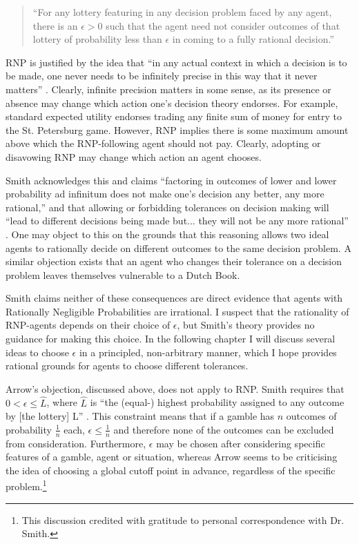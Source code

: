 \documentclass{article}
\begin{document}
\begin{quote}
\onehalfspacing
``For any lottery featuring in any decision problem faced by any agent, there is an \(\epsilon > 0\) such that the agent need not consider outcomes of that lottery of probability less than \(\epsilon\) in coming to a fully rational decision.'' \citep[pg. 472]{smith2014evaluative}
\end{quote}

\noindent
RNP is justified by the idea that ``in any actual context in which a decision is to be made, one never needs to be infinitely precise in this way \textemdash{} that it never matters'' \citep[pg. 474]{smith2014evaluative}. Clearly, infinite precision matters in some sense, as its presence or absence may change which action one's decision theory endorses. For example, standard expected utility endorses trading any finite sum of money for entry to the St. Petersburg game. However, RNP implies there is some maximum amount above which the RNP-following agent should not pay. Clearly, adopting or disavowing RNP may change which action an agent chooses.

Smith acknowledges this and claims ``factoring in outcomes of lower and lower probability ad infinitum does not make one’s decision any better, any more rational,'' and that allowing or forbidding tolerances on decision making will ``lead to different decisions being made \textemdash{} but... they will not be any more rational'' \citep[pg. 475]{smith2014evaluative}. One may object to this on the grounds that this reasoning allows two ideal agents to rationally decide on different outcomes to the same decision problem. A similar objection exists that an agent who changes their tolerance on a decision problem leaves themselves vulnerable to a Dutch Book. 

Smith claims neither of these consequences are direct evidence that agents with Rationally Negligible Probabilities are irrational. I suspect that the rationality of RNP-agents depends on their choice of \(\epsilon\), but Smith's theory provides no guidance for making this choice. In the following chapter I will discuss several ideas to choose \(\epsilon\) in a principled, non-arbitrary manner, which I hope provides rational grounds for agents to choose different tolerances. 

Arrow's objection, discussed above, does not apply to RNP. Smith requires that \(0 < \epsilon \leq \hat{L}\), where \(\hat{L}\) is ``the (equal-) highest probability assigned to any outcome by [the lottery] L'' \citep[pg. 479]{smith2014evaluative}. This constraint means that if a gamble has \(n\) outcomes of probability \(\frac{1}{n}\) each, \(\epsilon \leq \frac{1}{n}\) and therefore none of the outcomes can be excluded from consideration. Furthermore, \(\epsilon\) may be chosen after considering specific features of a gamble, agent or situation, whereas Arrow seems to be criticising the idea of choosing a global cutoff point in advance, regardless of the specific problem.\footnote{This discussion credited with gratitude to personal correspondence with Dr. Smith.}
\end{document}
